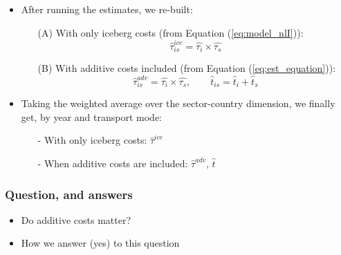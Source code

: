 \documentclass[10 pt,Helvetica, french]{beamer}
\begin{document}
\begin{frame}
\begin{itemize}
\item After running the estimates, we re-built: \vspace{0.1cm}
\begin{itemize}
\item[(A)] With only iceberg costs (from Equation (\ref{eq:model_nlI})):
$$\widehat{\tau}^{ice}_{is} = \widehat{\tau_{i}} \times \widehat{\tau_{s}}$$
\item[(B)] With additive costs included (from Equation (\ref{eq:est_equation})):
$$\widehat{\tau}^{adv}_{is} = \widehat{\tau_{i}} \times \widehat{\tau_{s}}, \qquad \widehat{t}_{is} = \widehat{t}_{i} + \widehat{t}_{s}$$
\end{itemize}
\item  Taking the weighted average over the sector-country dimension, we finally get, by year and transport mode: \vspace{0.1cm}
\begin{itemize}
\item[-] With only iceberg costs: $\widehat{\tau}^{ice}$ \vspace{0.1cm}
\item[-] When additive costs are included: $\widehat{\tau}^{adv}$, $\widehat{t}$  

\end{itemize}
\end{itemize}
\end{frame}

\begin{frame}
\frametitle{Question, and answers}
\begin{itemize}
\item Do additive costs matter? \vspace{0.5cm}
\item How we answer (yes) to this question
\end{itemize}
\end{frame}
\end{document}
